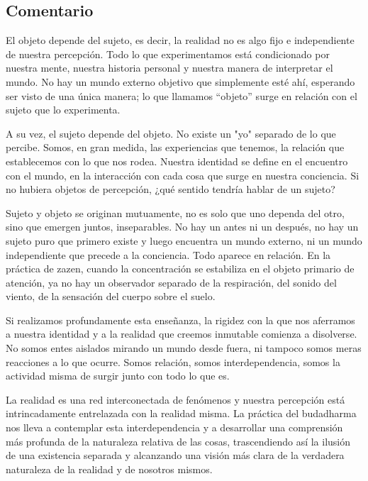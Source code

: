 \documentclass[
  a5paperpaper,
]{article}
\begin{document}
\hfill\break

\hypertarget{comentario-26}{%
\subsection{Comentario}\label{comentario-26}}

El objeto depende del sujeto, es decir, la realidad no es algo fijo e
independiente de nuestra percepción. Todo lo que experimentamos está
condicionado por nuestra mente, nuestra historia personal y nuestra
manera de interpretar el mundo. No hay un mundo externo objetivo que
simplemente esté ahí, esperando ser visto de una única manera; lo que
llamamos ``objeto'' surge en relación con el sujeto que lo experimenta.

A su vez, el sujeto depende del objeto. No existe un "yo" separado de lo
que percibe. Somos, en gran medida, las experiencias que tenemos, la
relación que establecemos con lo que nos rodea. Nuestra identidad se
define en el encuentro con el mundo, en la interacción con cada cosa que
surge en nuestra conciencia. Si no hubiera objetos de percepción, ¿qué
sentido tendría hablar de un sujeto?

Sujeto y objeto se originan mutuamente, no es solo que uno dependa del
otro, sino que emergen juntos, inseparables. No hay un antes ni un
después, no hay un sujeto puro que primero existe y luego encuentra un
mundo externo, ni un mundo independiente que precede a la conciencia.
Todo aparece en relación. En la práctica de zazen, cuando la
concentración se estabiliza en el objeto primario de atención, ya no hay
un observador separado de la respiración, del sonido del viento, de la
sensación del cuerpo sobre el suelo.

Si realizamos profundamente esta enseñanza, la rigidez con la que nos
aferramos a nuestra identidad y a la realidad que creemos inmutable
comienza a disolverse. No somos entes aislados mirando un mundo desde
fuera, ni tampoco somos meras reacciones a lo que ocurre. Somos
relación, somos interdependencia, somos la actividad misma de surgir
junto con todo lo que es.

La realidad es una red interconectada de fenómenos y nuestra percepción
está intrincadamente entrelazada con la realidad misma. La práctica del
budadharma nos lleva a contemplar esta interdependencia y a desarrollar
una comprensión más profunda de la naturaleza relativa de las cosas,
trascendiendo así la ilusión de una existencia separada y alcanzando una
visión más clara de la verdadera naturaleza de la realidad y de nosotros
mismos.
\end{document}
